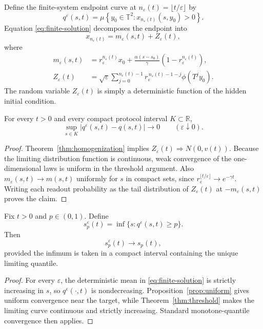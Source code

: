 \documentclass[11pt]{article}
\newcommand{\T}{\mathbb{T}}
\begin{document}
Define the finite-system endpoint curve at
\(n_\varepsilon(t)=\lfloor t/\varepsilon\rfloor\) by
\[
q^\varepsilon(s,t)
=
\mu\left\{
y_0\in\T^2:
x_{n_\varepsilon(t)}(s,y_0)>0
\right\}.
\]
Equation \eqref{eq:finite-solution} decomposes the endpoint into
\[
x_{n_\varepsilon(t)}
=m_\varepsilon(s,t)+Z_\varepsilon(t),
\]
where
\begin{align*}
m_\varepsilon(s,t)
&=
r_\varepsilon^{n_\varepsilon(t)}x_0
+\frac{\alpha(s-s_0)}{\gamma}
\left(1-r_\varepsilon^{n_\varepsilon(t)}\right),\\
Z_\varepsilon(t)
&=
\sqrt{\varepsilon}
\sum_{j=0}^{n_\varepsilon(t)-1}
r_\varepsilon^{\,n_\varepsilon(t)-1-j}\phi(T^j y_0).
\end{align*}
The random variable \(Z_\varepsilon(t)\) is simply a deterministic function of the hidden initial condition.

\begin{proposition}
\label{prop:uniform}
For every \(t>0\) and every compact protocol interval \(K\subset\mathbb{R}\),
\[
\sup_{s\in K}
\left|q^\varepsilon(s,t)-q(s,t)\right|
\longrightarrow0
\qquad
(\varepsilon\downarrow0).
\]
\end{proposition}

\begin{proof}
Theorem~\ref{thm:homogenization} implies
\(
Z_\varepsilon(t)\Rightarrow N(0,v(t))
\).
Because the limiting distribution function is continuous, weak convergence of the one-dimensional laws is uniform in the threshold argument. Also
\(
m_\varepsilon(s,t)\to m(s,t)
\)
uniformly for \(s\) in compact sets, since
\(
r_\varepsilon^{\lfloor t/\varepsilon\rfloor}\to e^{-\gamma t}
\).
Writing each readout probability as the tail distribution of \(Z_\varepsilon(t)\) at
\(-m_\varepsilon(s,t)\) proves the claim.
\end{proof}

\begin{corollary}
\label{cor:quantiles}
Fix \(t>0\) and \(p\in(0,1)\). Define
\[
s^\varepsilon_p(t)
=
\inf\{s:q^\varepsilon(s,t)\ge p\}.
\]
Then
\[
s^\varepsilon_p(t)\longrightarrow s_p(t),
\]
provided the infimum is taken in a compact interval containing the unique limiting quantile.
\end{corollary}

\begin{proof}
For every \(\varepsilon\), the deterministic mean in
\eqref{eq:finite-solution} is strictly increasing in \(s\), so
\(q^\varepsilon(\cdot,t)\) is nondecreasing. Proposition~\ref{prop:uniform} gives uniform convergence near the target, while Theorem~\ref{thm:threshold} makes the limiting curve continuous and strictly increasing. Standard monotone-quantile convergence then applies.
\end{proof}
\end{document}
